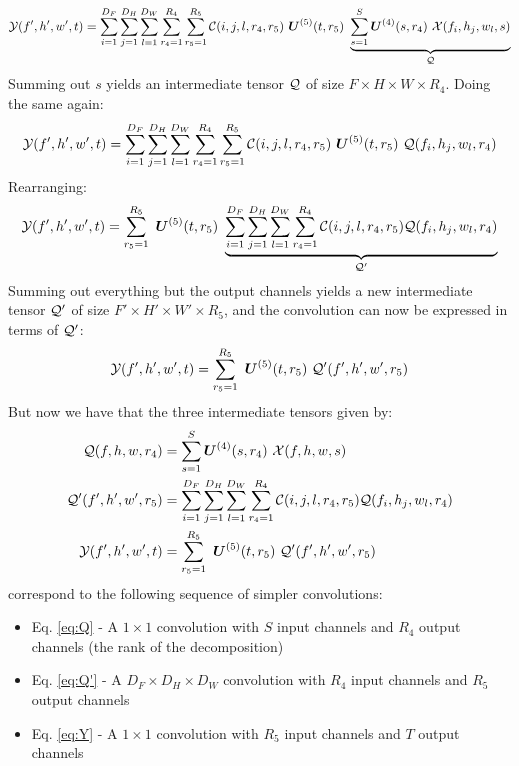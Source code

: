\begin{equation}
    \mathcal{Y}(f', h', w', t) = \sum_{i=1}^{D_F} \sum_{j=1}^{D_H} \sum_{l=1}^{D_W} \sum_{r_{4}=1}^{R_{4}} \sum_{r_{5}=1}^{R_{5}} \mathcal{C}(i, j, l, r_{4}, r_{5}) \ \boldsymbol{U}^{(5)}(t, r_{5}) \ \underbrace{\sum_{s=1}^{S} \boldsymbol{U}^{(4)}(s, r_{4}) \ \mathcal{X}(f_i, h_j, w_l, s)}_{\large \mathcal{Q}}
\end{equation}
Summing out $s$ yields an intermediate tensor $\mathcal{Q}$ of size $F\times H \times W \times R_4$. Doing the same again:
\begin{equation}
    \mathcal{Y}(f', h', w', t) = \sum_{i=1}^{D_F} \sum_{j=1}^{D_H} \sum_{l=1}^{D_W} \sum_{r_{4}=1}^{R_{4}} \sum_{r_{5}=1}^{R_{5}} \mathcal{C}(i, j, l, r_{4}, r_{5}) \ \boldsymbol{U}^{(5)}(t, r_{5}) \  \mathcal{Q} (f_i, h_j, w_l, r_4)
\end{equation}
Rearranging:
\begin{equation}
    \tensor{Y}(f', h', w', t) = \sum_{r_{5}=1}^{R_{5}} \ \boldsymbol{U}^{(5)}(t, r_{5}) \ \underbrace{\sum_{i=1}^{D_F} \sum_{j=1}^{D_H} \sum_{l=1}^{D_W} \sum_{r_{4}=1}^{R_{4}} \tensor{C}(i, j, l, r_{4}, r_{5})   \tensor{Q} (f_i, h_j, w_l, r_4)}_{\large \tensor{Q}'}
\end{equation}
Summing out everything but the output channels yields a new intermediate tensor $\mathcal{Q}'$ of size $F' \times H' \times W' \times R_5$, and the convolution can now be expressed in terms of $\mathcal{Q}'$:
\begin{equation}
    \tensor{Y}(f', h', w', t) = \sum_{r_{5}=1}^{R_{5}} \ \boldsymbol{U}^{(5)}(t, r_{5}) \ \tensor{Q}'(f', h', w', r_5)
\end{equation}
But now we have that the three intermediate tensors given by:
\begin{align}
    \tensor{Q}(f, h, w, r_4) &= \sum_{s=1}^{S} \boldsymbol{U}^{(4)}(s, r_{4}) \ \tensor{X}(f, h, w, s) \label{eq:Q}\\
    \tensor{Q'}(f', h', w', r_5) &= \sum_{i=1}^{D_F} \sum_{j=1}^{D_H} \sum_{l=1}^{D_W} \sum_{r_{4}=1}^{R_{4}} \tensor{C}(i, j, l, r_{4}, r_{5})   \tensor{Q} (f_i, h_j, w_l, r_4) \label{eq:Q'} \\
    \tensor{Y}(f', h', w', t) &=  \sum_{r_{5}=1}^{R_{5}} \ \boldsymbol{U}^{(5)}(t, r_{5}) \ \tensor{Q}'(f', h', w', r_5) \label{eq:Y}
\end{align}
correspond to the following sequence of simpler convolutions:
\begin{itemize}
    \item Eq. \eqref{eq:Q} - A $1\times 1$ convolution with $S$ input channels and $R_4$ output channels (the rank of the decomposition)
    \item Eq. \eqref{eq:Q'} - A $D_F \times D_H \times D_W$ convolution with $R_4$ input channels and $R_5$ output channels
    \item Eq. \eqref{eq:Y} - A $1\times 1$ convolution with $R_5$ input channels and $T$ output channels
\end{itemize}
